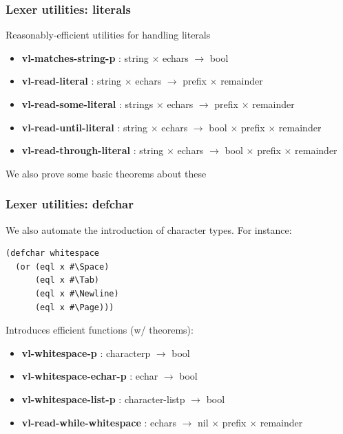 \documentclass{beamer}
\newcommand{\SmallSkip}{\vspace{0.5cm}\noindent}
\begin{document}
\begin{frame}
\frametitle{Lexer utilities: literals}

Reasonably-efficient utilities for handling literals
\begin{itemize}
\item {\bf vl-matches-string-p} : string $\times$ echars $\rightarrow$ bool
\item {\bf vl-read-literal} : string $\times$ echars $\rightarrow$ prefix $\times$ remainder
\item {\bf vl-read-some-literal} : strings $\times$ echars $\rightarrow$ prefix $\times$ remainder
\item {\bf vl-read-until-literal} : string $\times$ echars $\rightarrow$ bool $\times$ prefix $\times$ remainder
\item {\bf vl-read-through-literal} : string $\times$ echars $\rightarrow$ bool $\times$ prefix $\times$ remainder
\end{itemize}

\SmallSkip
We also prove some basic theorems about these
\end{frame}



\begin{frame}[fragile]
\frametitle{Lexer utilities: defchar}

\SmallSkip
We also automate the introduction of character types.  For instance:
\begin{verbatim}
(defchar whitespace 
  (or (eql x #\Space)
      (eql x #\Tab)
      (eql x #\Newline)
      (eql x #\Page)))
\end{verbatim}

Introduces efficient functions (w/ theorems):
\begin{itemize}
\item {\bf vl-whitespace-p} : characterp $\rightarrow$ bool
\item {\bf vl-whitespace-echar-p} : echar $\rightarrow$ bool
\item {\bf vl-whitespace-list-p} : character-listp $\rightarrow$ bool
\item {\bf vl-read-while-whitespace} : echars $\rightarrow$ nil $\times$ prefix $\times$ remainder
\end{itemize}
\end{frame}
\end{document}
